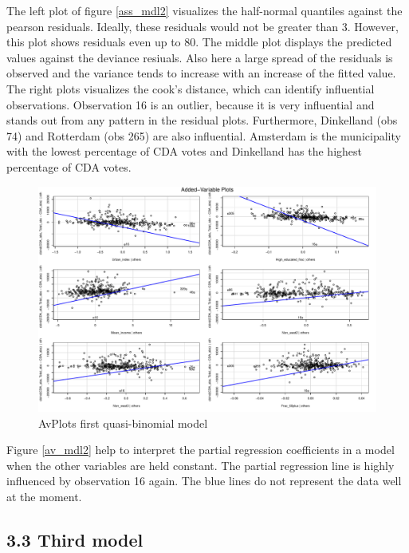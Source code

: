\documentclass[11pt,]{article}
\begin{document}
The left plot of figure \ref{ass_mdl2} visualizes the half-normal
quantiles against the pearson residuals. Ideally, these residuals would
not be greater than 3. However, this plot shows residuals even up to 80.
The middle plot displays the predicted values against the deviance
resiuals. Also here a large spread of the residuals is observed and the
variance tends to increase with an increase of the fitted value. The
right plots visualizes the cook's distance, which can identify
influential observations. Observation 16 is an outlier, because it is
very influential and stands out from any pattern in the residual plots.
Furthermore, Dinkelland (obs 74) and Rotterdam (obs 265) are also
influential. Amsterdam is the municipality with the lowest percentage of
CDA votes and Dinkelland has the highest percentage of CDA votes.

\begin{figure}[H]

{\centering \includegraphics{Report_files/figure-latex/unnamed-chunk-16-1} 

}

\caption{\label{av_mdl2}AvPlots first quasi-binomial model}\label{fig:unnamed-chunk-16}
\end{figure}

Figure \ref{av_mdl2} help to interpret the partial regression
coefficients in a model when the other variables are held constant. The
partial regression line is highly influenced by observation 16 again.
The blue lines do not represent the data well at the moment.

\subsection{3.3 Third model}\label{third-model}
\end{document}
